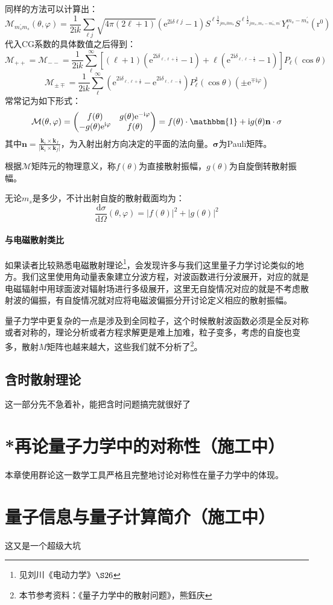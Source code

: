 \documentclass[a4paper,zihao=-4,linespread=1]{ctexrep}
\begin{document}
	同样的方法可以计算出：
	\begin{equation}
		\mathcal{M}_{m_s^\prime m_s}(\theta,\varphi)=\frac{1}{2\mathrm{i}k}\sum_{\ell j}\sqrt{4\pi(2\ell+1)}\left(\mathrm{e}^{2\mathrm{i}\delta{\ell j}}-1\right)S^{\ell\frac{1}{2}_{jm_s0m_s}}S^{\ell\frac{1}{2}_{jm_s,m_s-m_s^\prime,m^\prime}}Y^{m_s-m_s^\prime}_\ell(\mathrm{r}^0)
	\end{equation}
	代入CG系数的具体数值之后得到：
	\[\mathcal{M}_{++}=\mathcal{M}_{--}=\frac{1}{2\mathrm{i}k}\sum_\ell^{\infty}\left[(\ell+1)\left(\mathrm{e}^{2\mathrm{i}\delta_{\ell,\ell+\frac{1}{2}}}-1\right)+\ell\left(\mathrm{e}^{2\mathrm{i}\delta_{\ell,\ell-\frac{1}{2}}}-1\right)\right]P_\ell(\cos\theta)\]
	\[\mathcal{M}_{\pm\mp}=\frac{1}{2\mathrm{i}k}\sum_\ell^{\infty}\left(\mathrm{e}^{2\mathrm{i}\delta_{\ell,\ell+\frac{1}{2}}}-\mathrm{e}^{2\mathrm{i}\delta_{\ell,\ell-\frac{1}{2}}}\right)P_\ell^1(\cos\theta)\left(\pm\mathrm{e}^{\mp\mathrm{i}\varphi}\right)\]
	常常记为如下形式：
	\[
	\mathcal{M}(\theta,\varphi)=\begin{pmatrix}
	f(\theta)	& g(\theta)\mathrm{e}^{-\mathrm{i}\varphi}\\
	-g(\theta)\mathrm{e}^{\mathrm{i}\varphi}	&f(\theta)
	\end{pmatrix}=f(\theta)\cdot\mathbbm{1}+\mathrm{i}g(\theta)\mathbf{n}\cdot\mathbf{\sigma}
	\]
	其中$\mathbf{n}=\frac{\mathbf{k}_i\times\mathbf{k}_f}{|\mathbf{k}_i\times\mathbf{k}_f|}$，为入射出射方向决定的平面的法向量。$\mathbf{\sigma}$为Pauli矩阵。
	
	根据$\mathcal{M}$矩阵元的物理意义，称$f(\theta)$为直接散射振幅，$g(\theta)$为自旋倒转散射振幅。
	
	无论$m_s$是多少，不计出射自旋的散射截面均为：
	\[\frac{\mathrm{d}\sigma}{\mathrm{d}\Omega}(\theta,\varphi)=|f(\theta)|^2+|g(\theta)|^2\]
	\subsubsection{与电磁散射类比}
	如果读者比较熟悉电磁散射理论\footnote{见刘川《电动力学》$\S26$}，会发现许多与我们这里量子力学讨论类似的地方。我们这里使用角动量表象建立分波方程，对波函数进行分波展开，对应的就是电磁辐射中用球面波对辐射场进行多级展开，这里无自旋情况对应的就是不考虑散射波的偏振，有自旋情况就对应将电磁波偏振分开讨论定义相应的散射振幅。
	
	量子力学中更复杂的一点是涉及到全同粒子，这个时候散射波函数必须是全反对称或者对称的，理论分析或者方程求解更是难上加难，粒子变多，考虑的自旋也变多，散射$M$矩阵也越来越大，这些我们就不分析了\footnote{本节参考资料：《量子力学中的散射问题》，熊鈺庆}。
	\section{含时散射理论}
	这一部分先不急着补，能把含时问题搞完就很好了
	
	
	\chapter{*再论量子力学中的对称性（施工中）}
	本章使用群论这一数学工具严格且完整地讨论对称性在量子力学中的体现。
	
	\chapter{量子信息与量子计算简介（施工中）}
	这又是一个超级大坑
	
	
     
    
\end{document}
